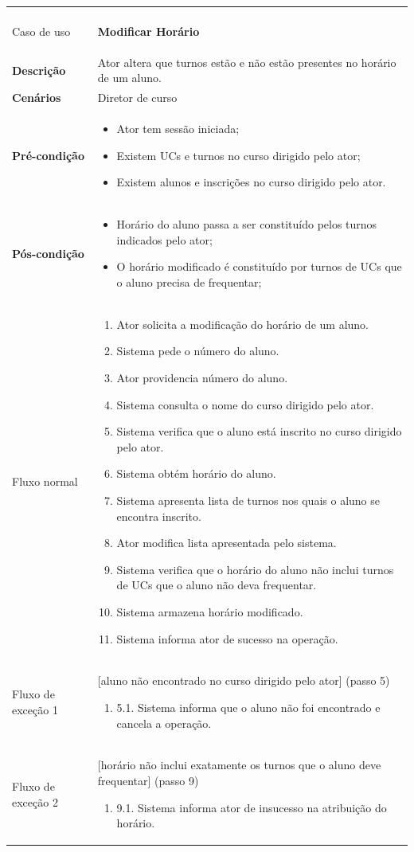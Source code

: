 \documentclass[12pt, a4paper]{article}
\newenvironment{condition}{
    \begin{itemize}[wide=0pt]
        \vspace{-0.2cm}
}{
        \vspace{-0.5cm}
    \end{itemize}
}
\newcommand\flow[1]{
    Fluxo normal &
    \vspace{-0.9cm}
    \singlespacing
    \begin{enumerate}[wide=0pt]
        #1
        \vspace{-0.3cm}
    \end{enumerate} \\ \hline
}
\newcommand\otherflow[3]{
    #1 &
    #2
    \singlespacing
    \begin{enumerate}[wide=0pt]
        #3
        \vspace{-0.3cm}
    \end{enumerate} \\ \hline
}
\newenvironment{usecase}[5]{
    \begin{longtable}{|>{\centering\arraybackslash\bf}m{3cm}|m{13cm}|}
        \multicolumn{2}{c}{\ldots Continua \ldots} \\
        \endfoot
        \endlastfoot

        \hline
        Caso de uso & \textbf{#1} \\

        \hline
        Descrição & #2 \\

        \hline
        Cenários & #3 \\

        \hline
        Pré-condição &
        \vspace{-0.8cm}
        \begin{condition}
            #4
        \end{condition} \\

        \hline
        Pós-condição &
        \vspace{-0.8cm}
        \begin{condition}
            #5
        \end{condition} \\

        \hline
}{
\end{longtable}
}
\begin{document}
\begin{usecase}
    {Modificar Horário}
    {Ator altera que turnos estão e não estão presentes no horário de um aluno.}
    {Diretor de curso}
    {
        \item Ator tem sessão iniciada;
        \item Existem UCs e turnos no curso dirigido pelo ator;
        \item Existem alunos e inscrições no curso dirigido pelo ator.
    }
    {
        \item Horário do aluno passa a ser constituído pelos turnos indicados pelo ator;
        \item O horário modificado é constituído por turnos de UCs que o aluno precisa de
            frequentar;
    }

    \flow{
        \item Ator solicita a modificação do horário de um aluno.
        \item Sistema pede o número do aluno.
        \item Ator providencia número do aluno.
        \item Sistema consulta o nome do curso dirigido pelo ator.
        \item Sistema verifica que o aluno está inscrito no curso dirigido pelo ator.
        \item Sistema obtém horário do aluno.
        \item Sistema apresenta lista de turnos nos quais o aluno se encontra inscrito.
        \item Ator modifica lista apresentada pelo sistema.
        \item  Sistema verifica que o horário do aluno não inclui turnos de UCs que o aluno não deva
            frequentar.
        \item Sistema armazena horário modificado.
        \item Sistema informa ator de sucesso na operação.
    }

    \otherflow{Fluxo de exceção 1}{[aluno não encontrado no curso dirigido pelo ator] (passo 5)}{
        \item[5.1.] Sistema informa que o aluno não foi encontrado e cancela a operação.
    }

    \otherflow{Fluxo de exceção 2}
              {[horário não inclui exatamente os turnos que o aluno deve frequentar] (passo 9)}{

        \item[9.1.] Sistema informa ator de insucesso na atribuição do horário.
    }
\end{usecase}
\end{document}
